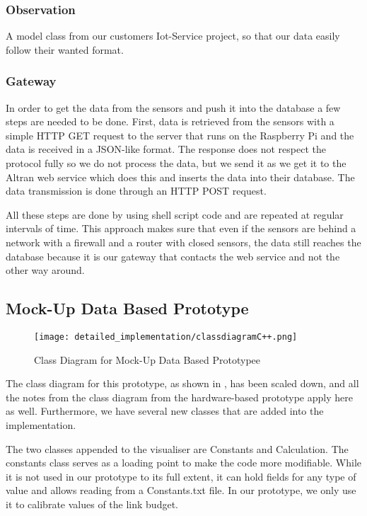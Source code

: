\documentclass[../document]{subfiles}
\begin{document}
\subsubsection{Observation}
A model class from our customers Iot-Service project, so that our data easily follow their wanted format.

\subsubsection{Gateway}
In order to get the data from the sensors and push it into the database a few steps are needed to be done. First, data is retrieved from the sensors with a simple \gls{HTTP} GET request to the server that runs on the \gls{Raspberry Pi} and the data is received in a \gls{JSON}-like format. The response does not respect the protocol fully so we do not process the data, but we send it as we get it to the \gls{Altran} web service which does this and inserts the data into their database. The data transmission is done through an \gls{HTTP} POST request. 

All these steps are done by using shell script code and are repeated at regular intervals of time.
This approach makes sure that even if the sensors are behind a network with a firewall and a router with closed sensors, the data still reaches the database because it is our gateway that contacts the web service and not the other way around.

\subsection{Mock-Up Data Based Prototype}

\begin{figure}[H]
\centering
\texttt{[image: detailed\_implementation/classdiagramC++.png]}
\caption{Class Diagram for Mock-Up Data Based Prototypee}
\label{fig:ClassDiagramC++}
\end{figure}

The class diagram for this prototype, as shown in , has been scaled down, and all the notes from the class diagram from the hardware-based prototype apply here as well. Furthermore, we have several new classes that are added into the implementation.

The two classes appended to the visualiser are Constants and Calculation. The constants class serves as a loading point to make the code more modifiable. While it is not used in our prototype to its full extent, it can hold fields for any type of value and allows reading from a Constants.txt file. In our prototype, we only use it to calibrate values of the link budget. 
\end{document}
